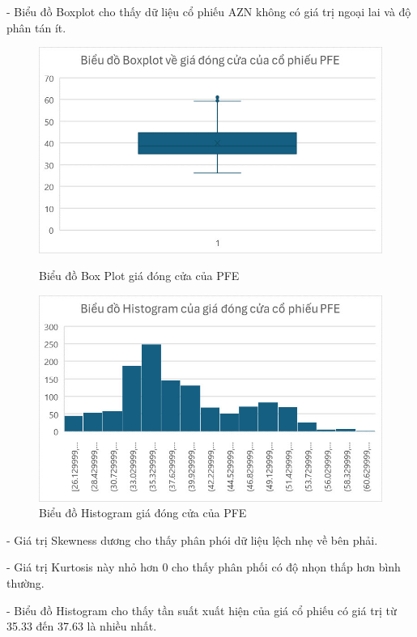 \documentclass[conference]{IEEEtran}
\begin{document}
- Biểu đồ Boxplot cho thấy dữ liệu cổ phiếu AZN không có giá trị ngoại lai và độ phân tán ít.
\begin{figure}[H]
    \centering
    \begin{minipage}{0.23\textwidth}
    \centering
    \includegraphics[width=1\textwidth]{Image/PFE_Boxplot.jpg}
    \caption{Biểu đồ Box Plot giá đóng cửa của PFE}
    \label{fig:1}
    \end{minipage}
    \hfill
    \begin{minipage}{0.23\textwidth}
    \centering
    \includegraphics[width=1\textwidth]{Image/PFE_Histogram.jpg}
    \caption{Biểu đồ Histogram giá đóng cửa của PFE}
    \label{fig:2}
    \end{minipage}
\end{figure}
- Giá trị Skewness dương cho thấy phân phói dữ liệu lệch nhẹ về bên phải.

- Giá trị Kurtosis này nhỏ hơn 0 cho thấy phân phối có độ nhọn thấp hơn bình thường.

- Biểu đồ Histogram cho thấy tần suất xuất hiện của giá cổ phiếu có giá trị từ 35.33 đến 37.63 là nhiều nhất.
\end{document}
